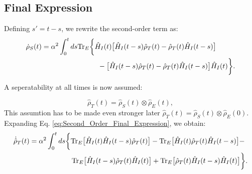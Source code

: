 
\subsection{Final Expression}
\label{subsec:Final_Expression}

Defining $s' = t - s$, we rewrite the second-order term as:
\begin{align}
	\dot{\rho}_S(t) & = \alpha^2 \int_0^t ds \mathrm{Tr}_E \bigg\{
	\hat{H}_I(t) \big[ \hat{H}_I(t-s) \hat{\rho}_T(t)  - \hat{\rho}_T(t) \hat{H}_I(t-s) \big] \notag                                          \\
	                & \qquad \qquad \qquad \qquad - \big[ \hat{H}_I(t-s) \hat{\rho}_T(t)  - \hat{\rho}_T(t) \hat{H}_I(t-s) \big] \hat{H}_I(t)
	\bigg\}.
	\label{eq:Second_Order_Final_Expression}
\end{align}

A seperatability at all times is now assumed:

\begin{equation}
	\hat{\rho}_T(t) = \hat{\rho}_S(t) \otimes \hat{\rho}_E(t),
	\label{eq:Reduced_Density_Matrix_Assumption}
\end{equation}
This assumtion has to be made even stronger later $\hat{\rho}_T(t) = \hat{\rho}_S(t) \otimes \hat{\rho}_E(0)$.
Expanding Eq. \eqref{eq:Second_Order_Final_Expression}, we obtain:
\begin{align}
	\dot{\hat{\rho}}_T(t) & =  \alpha^2 \int_0^t ds
	\bigg\{
	\mathrm{Tr}_E \big[ \hat{H}_I(t) \hat{H}_I(t-s) \hat{\rho}_T(t) \big] -
	\mathrm{Tr}_E \big[ \hat{H}_I(t) \hat{\rho}_T(t) \hat{H}_I(t-s) \big] - \notag \\
	                      & \qquad \qquad \qquad
	\mathrm{Tr}_E \big[ \hat{H}_I(t-s) \hat{\rho}_T(t) \hat{H}_I(t) \big] +
	\mathrm{Tr}_E \big[ \hat{\rho}_T(t) \hat{H}_I(t-s) \hat{H}_I(t) \big]
	\bigg\}.
	\label{eq:Expanded_Second_Order_Expression}
\end{align}

